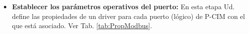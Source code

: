 \begin{itemize}
  \item \textbf{Establecer los parámetros operativos del puerto:}
    En esta etapa Ud. define las propiedades de un driver para cada 
    puerto (lógico) de P-CIM con el que está asociado.
    Ver Tab. \ref{tab:PropModbus}.
\end{itemize}
